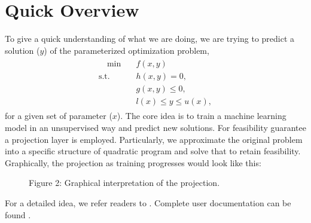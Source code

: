 \documentclass[letterpaper,10pt,english,openany,oneside]{sphinxmanual}
\begin{document}
\chapter{Quick Overview}
\label{\detokenize{index:quick-overview}}
\sphinxAtStartPar
To give a quick understanding of what we are doing, we are trying to predict a solution (\(y\)) of the parameterized optimization problem,
\begin{equation*}
\begin{split}\begin{aligned}
\quad
\min \quad & f(x,y) \\
\text{s.t.} \quad & h(x,y) = 0, \\
& g(x,y) \le 0, \\
& l(x) \le y \le u(x),
\end{aligned}\end{split}
\end{equation*}
\sphinxAtStartPar
for a given set of parameter (\(x\)). The core idea is to train a machine learning model in an unsupervised way and predict new solutions. For feasibility guarantee a projection layer is employed. Particularly, we approximate the original problem into a specific structure of quadratic program and solve that to retain feasibility. Graphically, the projection as training progresses would look like this:

\begin{figure}[htbp]
\centering
\capstart

\noindent{}
\caption{Figure 2: Graphical interpretation of the projection.}\label{\detokenize{index:id2}}\end{figure}

\sphinxAtStartPar
For a detailed idea, we refer readers to . Complete user documentation can be found .
\end{document}
